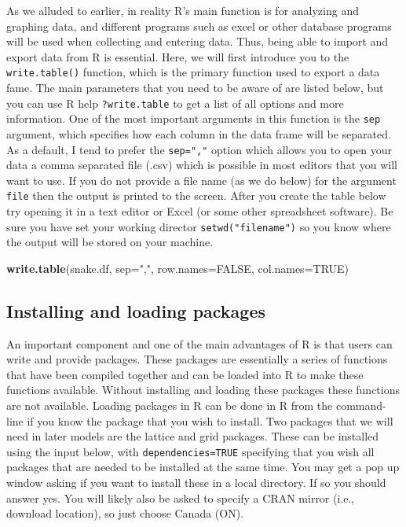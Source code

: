 \documentclass[
]{book}
\newenvironment{Shaded}{\begin{snugshade}}{\end{snugshade}}
\newcommand{\AttributeTok}[1]{\textcolor[rgb]{0.13,0.29,0.53}{#1}}
\newcommand{\ConstantTok}[1]{\textcolor[rgb]{0.56,0.35,0.01}{#1}}
\newcommand{\FunctionTok}[1]{\textcolor[rgb]{0.13,0.29,0.53}{\textbf{#1}}}
\newcommand{\NormalTok}[1]{#1}
\newcommand{\StringTok}[1]{\textcolor[rgb]{0.31,0.60,0.02}{#1}}
\begin{document}
As we alluded to earlier, in reality R's main function is for analyzing and graphing data, and different programs such as excel or other database programs will be used when collecting and entering data. Thus, being able to import and export data from R is essential. Here, we will first introduce you to the \texttt{write.table()} function, which is the primary function used to export a data fame. The main parameters that you need to be aware of are listed below, but you can use R help \texttt{?write.table} to get a list of all options and more information. One of the most important arguments in this function is the \texttt{sep} argument, which specifies how each column in the data frame will be separated. As a default, I tend to prefer the \texttt{sep=","} option which allows you to open your data a comma separated file (.csv) which is possible in most editors that you will want to use. If you do not provide a file name (as we do below) for the argument \texttt{file} then the output is printed to the screen. After you create the table below try opening it in a text editor or Excel (or some other spreadsheet software). Be sure you have set your working director \texttt{setwd("filename")} so you know where the output will be stored on your machine.

\begin{Shaded}
\begin{Highlighting}[]
\FunctionTok{write.table}\NormalTok{(snake.df, }\AttributeTok{sep=}\StringTok{","}\NormalTok{, }\AttributeTok{row.names=}\ConstantTok{FALSE}\NormalTok{, }\AttributeTok{col.names=}\ConstantTok{TRUE}\NormalTok{)}
\end{Highlighting}
\end{Shaded}

\hypertarget{installing-and-loading-packages}{%
\subsection{Installing and loading packages}\label{installing-and-loading-packages}}

An important component and one of the main advantages of R is that users can write and provide packages. These packages are essentially a series of functions that have been compiled together and can be loaded into R to make these functions available. Without installing and loading these packages these functions are not available. Loading packages in R can be done in R from the command-line if you know the package that you wish to install. Two packages that we will need in later models are the lattice and grid packages. These can be installed using the input below, with \texttt{dependencies=TRUE} specifying that you wish all packages that are needed to be installed at the same time. You may get a pop up window asking if you want to install these in a local directory. If so you should answer yes. You will likely also be asked to specify a CRAN mirror (i.e., download location), so just choose Canada (ON).
\end{document}
